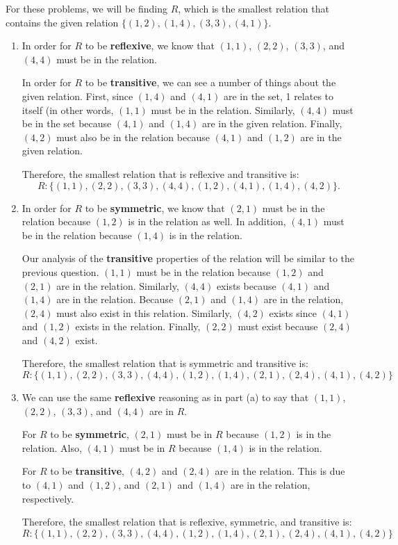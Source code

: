 \documentclass[11pt]{article}
\begin{document}
For these problems, we will be finding $R$, which is the smallest relation that contains the given relation $\{(1, 2),(1, 4),(3, 3),(4, 1)\}$.
\begin{enumerate}
    \item In order for $R$ to be \textbf{reflexive}, we know that $(1,1)$, $(2,2)$, $(3,3)$, and $(4,4)$ must be in the relation.
    
    In order for $R$ to be \textbf{transitive}, we can see a number of things about the given relation. First, since $(1,4)$ and $(4,1)$ are in the set, 1 relates to itself (in other words, $(1,1)$ must be in the relation. Similarly, $(4,4)$ must be in the set because $(4,1)$ and $(1,4)$ are in the given relation. Finally, $(4,2)$ must also be in the relation because $(4,1)$ and $(1,2)$ are in the given relation.
    
    Therefore, the smallest relation that is reflexive and transitive is:
    \[R: \{(1,1), (2,2), (3,3), (4,4), (1,2), (4,1), (1,4), (4,2)\}.\]
    
    \item In order for $R$ to be \textbf{symmetric}, we know that $(2,1)$ must be in the relation because $(1,2)$ is in the relation as well. In addition, $(4,1)$ must be in the relation because $(1,4)$ is in the relation.
    
    Our analysis of the \textbf{transitive} properties of the relation will be similar to the previous question. $(1,1)$ must be in the relation because $(1,2)$ and $(2,1)$ are in the relation. Similarly, $(4,4)$ exists because $(4,1)$ and $(1,4)$ are in the relation. Because $(2,1)$ and $(1,4)$ are in the relation, $(2,4)$ must also exist in this relation. Similarly, $(4,2)$ exists since $(4,1)$ and $(1,2)$ exists in the relation. Finally, $(2,2)$ must exist because $(2,4)$ and $(4,2)$ exist.
    
    Therefore, the smallest relation that is symmetric and transitive is:
    \[R: \{(1,1), (2,2), (3,3), (4,4), (1,2), (1,4), (2,1), (2,4), (4,1), (4,2)\}\]
    
    \item We can use the same \textbf{reflexive} reasoning as in part (a) to say that $(1,1)$, $(2,2)$, $(3,3)$, and $(4,4)$ are in $R$.
    
    For $R$ to be \textbf{symmetric}, $(2,1)$ must be in $R$ because $(1,2)$ is in the relation. Also, $(4,1)$ must be in $R$ because $(1,4)$ is in the relation.
    
    For $R$ to be \textbf{transitive}, $(4,2)$ and $(2,4)$ are in the relation. This is due to $(4,1)$ and $(1,2)$, and $(2,1)$ and $(1,4)$ are in the relation, respectively.
    
    Therefore, the smallest relation that is reflexive, symmetric, and transitive is:
    \[R: \{(1,1), (2,2), (3,3), (4,4), (1,2), (1,4), (2,1), (2,4), (4,1), (4,2)\}\]
\end{enumerate}
\end{document}
